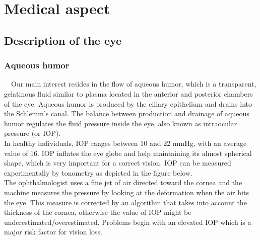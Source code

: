 \documentclass[english,12pt]{article}
\begin{document}
\section{Medical aspect}\label{s2}
\subsection{Description of the eye}
\subsubsection{Aqueous humor }\
\indent\ Our main interest resides in the flow of aqueous humor, which is a transparent, gelatinous fluid similar to plasma located in the anterior and posterior chambers of the eye. Aqueous humor is produced by the ciliary epithelium and drains into the Schlemm's canal. The balance between production and drainage of aqueous humor regulates the fluid pressure inside the eye, also known as intraocular pressure (or IOP). \\
\indent In healthy individuals, IOP ranges between 10 and 22 mmHg, with an average value of 16. 
IOP inflates the eye globe and help maintaining its almost spherical shape, which is very important for a correct vision. 
IOP can be measured experimentally by tonometry as depicted in the figure below.\\
\indent The ophthalmologist uses a fine jet of air directed toward the cornea and the machine measures the pressure by looking at the deformation when the air hits the eye. This measure is corrected by an algorithm that takes into account the thickness of the cornea, otherwise the value of IOP might be underestimated/overestimated.
Problems begin with an elevated IOP which is a major risk factor for vision loss.
\end{document}
